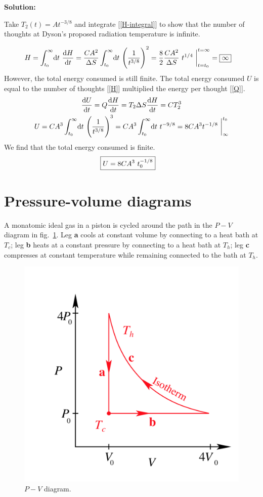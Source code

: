 \documentclass{article}
\renewcommand{\d}[1]{\ensuremath{\operatorname{d}\!{#1}}}
\newenvironment{solution}[0]{
\vspace{2mm}
\noindent
\textbf{Solution:}
}
\numberwithin{equation}{section}
\begin{document}
\begin{solution}
Take $T_2(t) = At^{-3/8}$ and integrate [\ref{H-integral}] to show that the number of thoughts at Dyson's proposed radiation temperature is infinite.

\begin{align}
H &= \int_{t_0}^{\infty}\! \d{t} \ \dv{H}{t} = \frac{CA^2}{\Delta S}\int_{t_0}^{\infty} \! \d{t} \ \Bigg(\frac{1}{t^{3/8}} \Bigg)^2
= \frac{8}{2}\frac{CA^2}{\Delta S}  \ t^{1/4}\ \bigg|_{t = t_0}^{t = \infty} = \boxed{\infty}\label{H}
\end{align}
However, the total energy consumed is still finite. The total energy consumed $U$ is equal to the number of thoughts [\ref{H}] multiplied the energy per thought [\ref{Q}].
\begin{gather}
\dv{U}{t} = Q \dv{H}{t} = T_2\Delta S \dv{H}{t} = CT_2^3
\\
U = CA^3\int_{t_0}^{\infty} \! \d{t} \
\Bigg(\frac{1}{t^{3/8}} \Bigg)^3 = CA^3\int_{t_0}^{\infty} \! \d{t} \ t^{-9/8}
= 8 C A^3 t^{-1/8} \ \bigg|_{\infty}^{t_0}
\end{gather}
We find that the total energy consumed is finite.
\begin{align}
\Aboxed{U &= 8 C A^3 \ t_0^{-1/8}}
\end{align}
\end{solution}

















\newpage
\section{Pressure-volume diagrams}

A monatomic ideal gas in a piston is cycled around the path in the $P-V$ diagram in fig.~\ref{P-V}. Leg \textbf{a} cools at constant volume by connecting to a heat bath at $T_c$; leg \textbf{b} heats at a constant pressure by connecting to a heat bath at $T_h$; leg \textbf{c} compresses at constant temperature while remaining connected to the bath at $T_h$.

\begin{figure}[h!]
\centering
\includegraphics[width=0.3\linewidth]{PSet3_Fig1}
\caption{$P-V$ diagram.\label{P-V}}
\end{figure}
\end{document}
